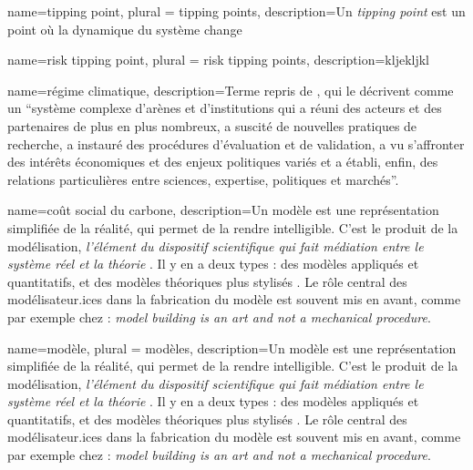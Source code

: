 


{
    name=tipping point, 
    plural = tipping points, 
    description={Un \textit{tipping point} est un point où la dynamique du système change \cite{acemoglu_colonial_2001} }
}

{
    name=risk tipping point,
    plural = risk tipping points, 
    description={kljekljkl}
}

{
    name=régime climatique, 
    description={Terme repris de \cite{aykut_gouverner_nodate}, qui le décrivent comme un \enquote{système complexe d’arènes et d’institutions qui a réuni des acteurs et des partenaires de plus en plus nombreux, a suscité de nouvelles pratiques de recherche, a instauré des procédures d’évaluation et de validation, a vu s’affronter des intérêts économiques et des enjeux politiques variés et a établi, enfin, des relations particulières entre sciences, expertise, politiques et marchés}.}
}

{
    name=coût social du carbone, 
    description={Un modèle est une représentation simplifiée de la réalité, qui permet de la rendre intelligible. C'est le produit de la modélisation, \textit{l'élément du dispositif scientifique qui fait médiation entre le système réel et la théorie} \cite{briens_decroissance_2015}. Il y en a deux types : des modèles appliqués et quantitatifs, et des modèles théoriques plus stylisés \cite{briens_decroissance_2015}. Le rôle central des modélisateur.ices dans la fabrication du modèle est souvent mis en avant, comme par exemple chez \cite{beck_epistemic_2016} : \textit{model building is an art and not a mechanical procedure}. \\}
}


{
    name=modèle, 
    plural = modèles, 
    description={Un modèle est une représentation simplifiée de la réalité, qui permet de la rendre intelligible. C'est le produit de la modélisation, \textit{l'élément du dispositif scientifique qui fait médiation entre le système réel et la théorie} \cite{briens_decroissance_2015}. Il y en a deux types : des modèles appliqués et quantitatifs, et des modèles théoriques plus stylisés \cite{briens_decroissance_2015}. Le rôle central des modélisateur.ices dans la fabrication du modèle est souvent mis en avant, comme par exemple chez \cite{beck_epistemic_2016} : \textit{model building is an art and not a mechanical procedure}. \\}
}

